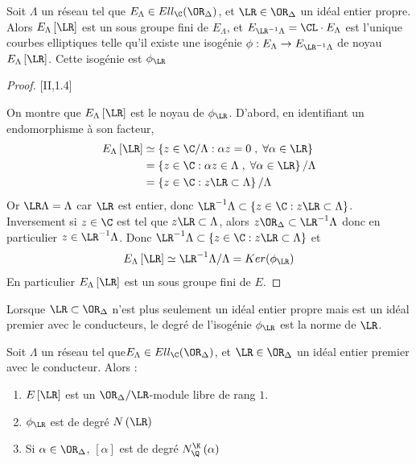 \begin{Prop}
	Soit $\Lambda$ un réseau tel que $E_{\Lambda}\in Ell_{\C}(\OR_{\Delta})$, et $\LR\in\OR_{\Delta}$ un idéal entier propre. Alors $E_{\Lambda}\left[ \LR\right]$ est un sous groupe fini de $E_{\Lambda}$, et $E_{\LR^{-1}\Lambda} = \CL\cdot E_{\Lambda}$ est l'unique courbes elliptiques telle qu'il existe une isogénie $\phi : E_{\Lambda}\rightarrow E_{\LR^{-1}\Lambda}$ de noyau $E_{\Lambda}\left[ \LR\right]$. Cette isogénie est $\phi_{\LR}$
	
\end{Prop}


\begin{proof}\cite{Sil94}[II,1.4]
	
	On montre que $E_{\Lambda}\left[ \LR\right]$ est le noyau de $\phi_{\LR}$. D'abord, en identifiant un endomorphisme à son facteur,
	\begin{align*}
		E_{\Lambda}\left[ \LR\right]&\simeq \left\lbrace z\in\C/\Lambda : \alpha z = 0 \;,\; \forall\alpha\in\LR\right\rbrace \\
		&=\left\lbrace z\in\C : \alpha z\in\Lambda \;,\;\forall\alpha\in\LR\right\rbrace / \Lambda\\
		&=\left\lbrace z\in\C : z\LR\subset\Lambda\right\rbrace / \Lambda
	\end{align*}
	Or $\LR\Lambda = \Lambda$ car $\LR$ est entier, donc $ \LR^{-1}\Lambda \subset \left\lbrace z\in\C : z\LR\subset\Lambda\right\rbrace $. Inversement si $z\in\C$ est tel que $z\LR\subset\Lambda$, alors $z\OR_{\Delta}\subset\LR^{-1}\Lambda$ donc en particulier $z\in\LR^{-1}\Lambda$. Donc $ \LR^{-1}\Lambda \subset \left\lbrace z\in\C : z\LR\subset\Lambda\right\rbrace $ et
	\begin{equation*}
		E_{\Lambda}\left[ \LR\right]\simeq\LR^{-1}\Lambda/\Lambda = Ker(\phi_{\LR})
	\end{equation*}
	En particulier $E_{\Lambda}\left[ \LR\right]$ est un sous groupe fini de $E$. 
	
\end{proof}

Lorsque $\LR\subset\OR_{\Delta}$ n'est plus seulement un idéal entier propre mais est un idéal premier avec le conducteurs, le degré de l'isogénie $\phi_{\LR}$ est la norme de $\LR$. 

\begin{Prop}
	Soit $\Lambda$ un réseau tel que$E_{\Lambda}\in Ell_{\C}(\OR_{\Delta})$, et $\LR\in\OR_{\Delta}$ un idéal entier premier avec le conducteur. Alors :
	\begin{enumerate}
		\item $E\left[\LR\right]$ est un $\OR_{\Delta}/\LR$-module libre de rang $1$.
		\item $\phi_{\LR}$ est de degré $N\left( \LR\right)$ 
		\item Si $\alpha\in\OR_{\Delta}$, $[\alpha]$ est de degré $N_{\Q}^{\K}\left( \alpha\right) $
	\end{enumerate}
	
\end{Prop}


